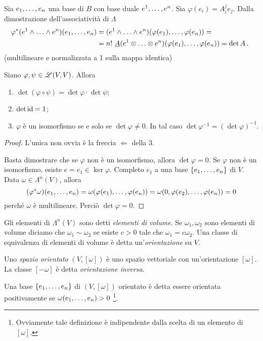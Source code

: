 \begin{proposition}
	Sia $\seqb en,$ una base di $B$ con base duale $\seqa en,$. Sia $\varphi(e_i) = A_i^je_j$.
	Dalla dimostrazione dell'associatività di $\Lambda$
	\begin{align*}
		\varphi^*(\seqa en\wedge) (\seqb en,) &= (\seqa en\wedge)(\varphi(e_1),\ldots, \varphi(e_n)) =\\
		&=n!\ \antisimm (\seqa en\otimes)(\varphi(e_1),\ldots,\varphi(e_n)) = \det A
		\punto
	\end{align*}
	(multilineare e normalizzata a 1 sulla mappa identica)
\end{proposition}

\begin{proposition}
	Siano $\varphi,\psi \in\Lin(V,V)$. Allora
	\begin{enumerate}
		\item $\det(\varphi\circ\psi) = \det \varphi \cdot \det \psi$;
		\item $\det \id = 1$;
		\item $\varphi$ è un isomorfismo se e solo se $\det\varphi\not=0$. In tal caso $\det\varphi^{-1} = (\det \varphi)^{-1}$.
	\end{enumerate}
\end{proposition}
\begin{proof}
	L'unica non ovvia è la freccia $\Leftarrow$ della 3.
	
	Basta dimostrare che se $\varphi$ non è un isomorfismo, allora $\det\varphi = 0$.
	Se $\varphi$ non è un isomorfismo, esiste $e=e_1\in\ker\varphi$. Completo $e_1$ a una base $\{\seqb en,\}$ di $V$. Data $\omega\in\Lambda^n(V)$, allora
	\begin{equation*}
		(\varphi^*\omega)(\seqb en,) = \omega(\varphi(e_1),\ldots,\varphi(e_n)) = \omega(0,\varphi(e_2),\ldots,\varphi(e_n)) = 0
	\end{equation*}
	perché $\omega$ è multilineare. Perciò $\det\varphi = 0$.
\end{proof}

\begin{definition} 
	Gli elementi di $\Lambda^n(V)$ sono detti \emph{elementi di volume}. Se $\omega_1,\omega_2$ sono elementi di volume diciamo che $\omega_1\sim \omega_2$ se esiste $c>0$ tale che $\omega_1 = c\omega_2$. Una classe di equivalenza di elementi di volume è detta un'\emph{orientazione} su $V$.
	
	Uno \emph{spazio orientato} $(V, [\omega])$ è uno spazio vettoriale con un'orientazione $[\omega]$. La classe $[-\omega]$ è detta \emph{orientazione inversa}.
	
	Una base $\{\seqb en,\}$ di $(V,[\omega])$ orientato è detta essere orientata positivamente se $\omega(\seqb en,)>0$ \footnote{Ovviamente tale definizione è indipendente dalla scelta di un elemento di $[\omega]$.}.
\end{definition}

